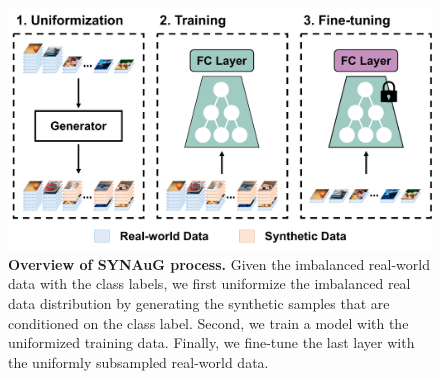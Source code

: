 \begin{figure}[t]
    \centering
    \includegraphics[width=1.0\linewidth]{figures/final.pdf}
    \caption{\textbf{Overview of SYNAuG process.}
    Given the imbalanced real-world data with the class labels, we first uniformize the imbalanced real data distribution by generating the synthetic samples that are conditioned on the class label.
    Second, we train a model with the uniformized training data.
    Finally, we fine-tune the last layer with the uniformly subsampled real-world data.}
    \label{fig:overview}
\end{figure}

